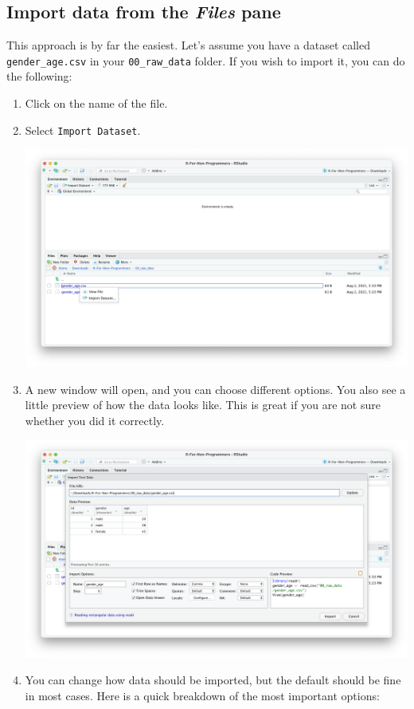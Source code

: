 \documentclass[
  letterpaper,
]{krantz}
\begin{document}
\subsection{\texorpdfstring{Import data from the \emph{Files}
pane}{Import data from the Files pane}}\label{import-data-from-the-files-pane}

This approach is by far the easiest. Let's assume you have a dataset
called \texttt{gender\_age.csv} in your \texttt{00\_raw\_data} folder.
If you wish to import it, you can do the following:

\begin{enumerate}
\def\labelenumi{\arabic{enumi}.}
\item
  Click on the name of the file.
\item
  Select \texttt{Import\ Dataset}.

  \includegraphics{images/chapter_07_img/01_files_pane_import/01_files_pane_import.png}
\item
  A new window will open, and you can choose different options. You also
  see a little preview of how the data looks like. This is great if you
  are not sure whether you did it correctly.

  \includegraphics{images/chapter_07_img/01_files_pane_import/02_files_pane_import.png}
\item
  You can change how data should be imported, but the default should be
  fine in most cases. Here is a quick breakdown of the most important
  options:


\end{enumerate}
\end{document}
